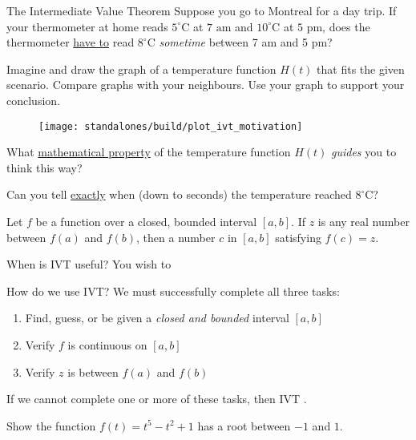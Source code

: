 \documentclass[../main.tex]{subfiles}
\begin{document}
\begin{lesson}{The Intermediate Value Theorem}
  \faComments{} Suppose you go to Montreal for a day trip. If your thermometer at home reads \(5^{\circ}\)C at \(7 \text{ am}\) and \({10}^{\circ}\)C at \(5\text{ pm}\), does the thermometer \underline{have to} read \({8}^{\circ}\)C \emph{sometime} between 7 am and 5 pm?


  Imagine and draw the graph of a temperature function \(H(t)\) that fits the given scenario. Compare graphs with your neighbours. Use your graph to support your conclusion.

  \begin{figure}[!h]  %
    \centering
    \texttt{[image: standalones/build/plot\_ivt\_motivation]}
    \label{fig:label}
  \end{figure}

  What \underline{mathematical property} of the temperature function \(H(t)\) \emph{guides} you to think this way?

  Can you tell \underline{exactly} when (down to seconds) the temperature reached \(8^{\circ}\)C?

  \begin{mdframed}[style=withref]
    Let \(f\) be a \underline{\hspace{1in}} function over a closed, bounded interval \([a,b]\). If \(z\) is any real number between \(f(a)\) and \(f(b)\), then \underline{\hspace{1in}} a number \(c\) in \([a,b]\) satisfying \(f(c) = z\).

  \end{mdframed}

  When is IVT useful? You wish to 
  \large{}

  How do we use IVT? We must successfully complete all three tasks: 
  \begin{enumerate}[label=(IVT \arabic*)]
    \item Find, guess, or be given {a \emph{closed and bounded} interval \([a,b]\)}
    \item Verify {\(f\) is continuous on \([a,b]\)}
    \item Verify {\(z\) is between \(f(a)\) and \(f(b)\)}
  \end{enumerate}
  If we cannot complete one or more of these tasks, then IVT .

  \begin{example}
    Show the function \(f(t) = t^{5} - t^{2} + 1\) has a root between \(-1\) and \(1\).
  \end{example}
\end{lesson}
\end{document}
